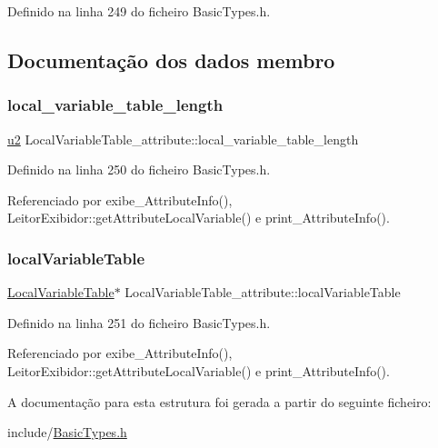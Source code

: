 Definido na linha 249 do ficheiro Basic\+Types.\+h.



\subsection{Documentação dos dados membro}
\mbox{\label{structLocalVariableTable__attribute_a64ee9d68a72f161a074d912bc0b8802f}} 
\subsubsection{\texorpdfstring{local\+\_\+variable\+\_\+table\+\_\+length}{local\_variable\_table\_length}}
{\footnotesize\ttfamily \hyperlink{BasicTypes_8h_a732cde1300aafb73b0ea6c2558a7a54f}{u2} Local\+Variable\+Table\+\_\+attribute\+::local\+\_\+variable\+\_\+table\+\_\+length}



Definido na linha 250 do ficheiro Basic\+Types.\+h.



Referenciado por exibe\+\_\+\+Attribute\+Info(), Leitor\+Exibidor\+::get\+Attribute\+Local\+Variable() e print\+\_\+\+Attribute\+Info().

\mbox{\label{structLocalVariableTable__attribute_aac0a6412785ab3e1be4ec14b381a4eba}} 
\subsubsection{\texorpdfstring{local\+Variable\+Table}{localVariableTable}}
{\footnotesize\ttfamily \hyperlink{structLocalVariableTable}{Local\+Variable\+Table}$\ast$ Local\+Variable\+Table\+\_\+attribute\+::local\+Variable\+Table}



Definido na linha 251 do ficheiro Basic\+Types.\+h.



Referenciado por exibe\+\_\+\+Attribute\+Info(), Leitor\+Exibidor\+::get\+Attribute\+Local\+Variable() e print\+\_\+\+Attribute\+Info().



A documentação para esta estrutura foi gerada a partir do seguinte ficheiro\+:\begin{DoxyCompactItemize}
\item 
include/\hyperlink{BasicTypes_8h}{Basic\+Types.\+h}\end{DoxyCompactItemize}
